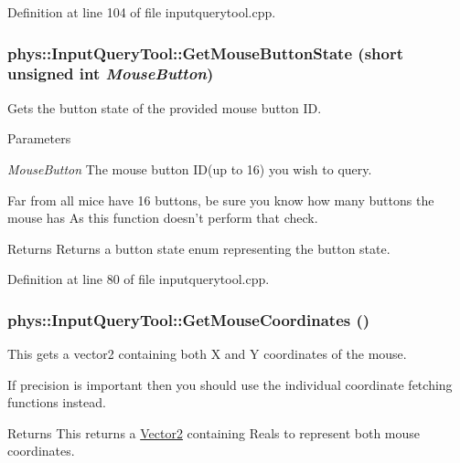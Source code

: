 Definition at line 104 of file inputquerytool.cpp.

\hypertarget{classphys_1_1InputQueryTool_a1ef8b70af163d8bc703fd16c3fcce22d}{
\subsubsection[{GetMouseButtonState}]{ phys::InputQueryTool::GetMouseButtonState (short unsigned int {\em MouseButton})}}
\label{da/d96/classphys_1_1InputQueryTool_a1ef8b70af163d8bc703fd16c3fcce22d}


Gets the button state of the provided mouse button ID. 


\begin{DoxyParams}{Parameters}
\item[{\em MouseButton}]The mouse button ID(up to 16) you wish to query.\end{DoxyParams}
Far from all mice have 16 buttons, be sure you know how many buttons the mouse has As this function doesn't perform that check. \begin{DoxyReturn}{Returns}
Returns a button state enum representing the button state. 
\end{DoxyReturn}


Definition at line 80 of file inputquerytool.cpp.

\hypertarget{classphys_1_1InputQueryTool_affd9523f67b542b208e6d36c3395e72b}{
\subsubsection[{GetMouseCoordinates}]{ phys::InputQueryTool::GetMouseCoordinates ()}}
\label{da/d96/classphys_1_1InputQueryTool_affd9523f67b542b208e6d36c3395e72b}


This gets a vector2 containing both X and Y coordinates of the mouse. 

If precision is important then you should use the individual coordinate fetching functions instead. \begin{DoxyReturn}{Returns}
This returns a \hyperlink{classphys_1_1Vector2}{Vector2} containing Reals to represent both mouse coordinates. 
\end{DoxyReturn}


